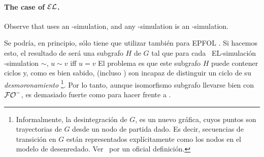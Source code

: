 {\paragraph{The case of $\mathcal{EL}$.}
Observe that  uses an \EL-simulation, and any
\EPFOL-simulation is an \EL-simulation.
%

Se podría, en principio, sólo tiene que utilizar  también para EPFOL
\EL. Si hacemos esto, el resultado de  será una
subgrafo $ H $ de $ G $ tal que para cada \ EL-simulación \EL-simulation $\sim$, $u
\sim v$ iff $u = v$ El problema es que este subgrafo $ H $ puede
contener ciclos y, como es bien sabido, \EL (incluso \ALC) son
incapaz de distinguir un ciclo de su {\em
desmoronamiento} \footnote {Informalmente, la desintegración de $ G $, es un nuevo
gráfica, cuyos puntos son trayectorias de $ G $ desde un nodo de partida dado.
Es decir, secuencias de transición en $ G $ están representados explícitamente como
los nodos en el modelo de desenredado. Ver~\cite{BRV01} por un oficial
definición.}. Por lo tanto, aunque isomorfismo subgrafo llevarse bien con
${\mathcal{FO}^-}$, es demasiado fuerte como para hacer frente a \EL.
%
%



}
